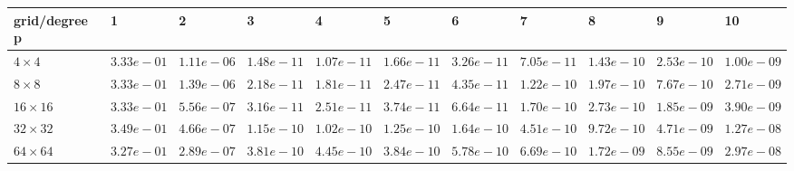 \begin{tabular}{lllllllllll}
\hline
 grid/degree p   & 1          & 2          & 3          & 4          & 5          & 6          & 7          & 8          & 9          & 10         \\
\hline
 $4 \times 4$    & $3.33e-01$ & $1.11e-06$ & $1.48e-11$ & $1.07e-11$ & $1.66e-11$ & $3.26e-11$ & $7.05e-11$ & $1.43e-10$ & $2.53e-10$ & $1.00e-09$ \\
 $8 \times 8$    & $3.33e-01$ & $1.39e-06$ & $2.18e-11$ & $1.81e-11$ & $2.47e-11$ & $4.35e-11$ & $1.22e-10$ & $1.97e-10$ & $7.67e-10$ & $2.71e-09$ \\
 $16 \times 16$  & $3.33e-01$ & $5.56e-07$ & $3.16e-11$ & $2.51e-11$ & $3.74e-11$ & $6.64e-11$ & $1.70e-10$ & $2.73e-10$ & $1.85e-09$ & $3.90e-09$ \\
 $32 \times 32$  & $3.49e-01$ & $4.66e-07$ & $1.15e-10$ & $1.02e-10$ & $1.25e-10$ & $1.64e-10$ & $4.51e-10$ & $9.72e-10$ & $4.71e-09$ & $1.27e-08$ \\
 $64 \times 64$  & $3.27e-01$ & $2.89e-07$ & $3.81e-10$ & $4.45e-10$ & $3.84e-10$ & $5.78e-10$ & $6.69e-10$ & $1.72e-09$ & $8.55e-09$ & $2.97e-08$ \\
\hline
\end{tabular}